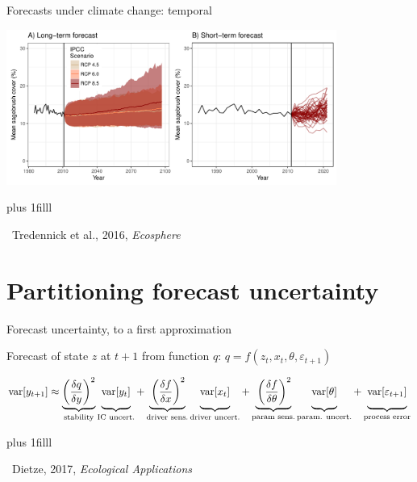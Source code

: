 \documentclass[12pt, compress, aspectratio=1610]{beamer}
\newcommand{\btVFill}{\vskip0pt plus 1filll}
\newcommand{\credit}[1]{\btVFill\par\hfill \footnotesize ~#1}
\begin{document}
\begin{frame}{%
\protect\hypertarget{forecasts-under-climate-change-temporal}{%
Forecasts under climate change: temporal}}

\centering

\includegraphics[height=2in]{./figures/temporal_forecasts_presentation.pdf}

\credit{Tredennick et al., 2016, \emph{Ecosphere}}

\end{frame}

\hypertarget{partitioning-forecast-uncertainty}{%
\section{Partitioning forecast
uncertainty}\label{partitioning-forecast-uncertainty}}

\begin{frame}{%
\protect\hypertarget{forecast-uncertainty-to-a-first-approximation}{%
Forecast uncertainty, to a first approximation}}

Forecast of state \(z\) at \(t+1\) from function \(q\):
\(q = f(z_t, x_t, \theta, \varepsilon_{t+1})\)

\small

\begin{align*}
\text{var}[y_{t+1}] \approx \underbrace{\left(\frac{\delta q}{\delta y} \right)^2}_{\text{stability}} 
               \underbrace{\vphantom{ \left(\frac{\delta q}{\delta y} \right)^2 } \text{var}[y_t]}_{\text{IC uncert.}} +
               \underbrace{\vphantom{ \left(\frac{\delta q}{\delta y} \right)^2 }\left(\frac{\delta f}{\delta x} \right)^2}_{\text{driver sens.}} 
               \underbrace{\vphantom{ \left(\frac{\delta q}{\delta y} \right)^2 } \text{var}[x_t]}_{\text{driver uncert.}} +
               \underbrace{\vphantom{ \left(\frac{\delta q}{\delta y} \right)^2 }\left(\frac{\delta f}{\delta \theta} \right)^2}_{\text{param sens.}}
               \underbrace{\vphantom{ \left(\frac{\delta q}{\delta y} \right)^2 } \text{var}[\theta]}_{\text{param. uncert.}} +
               \underbrace{\vphantom{ \left(\frac{\delta q}{\delta y} \right)^2 } \text{var}[\varepsilon_{t+1}]}_{\text{process error}}
\end{align*}

\credit{Dietze, 2017, \emph{Ecological Applications}}

\end{frame}
\end{document}
